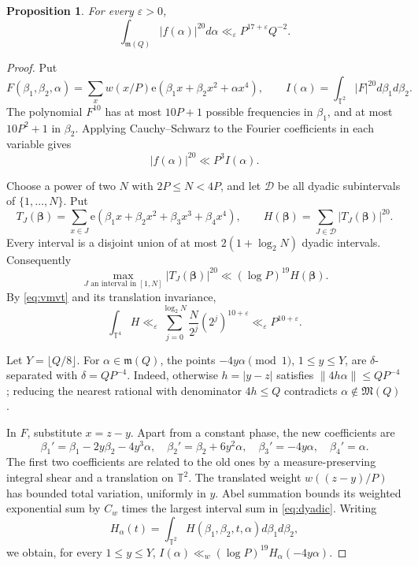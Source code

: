 \documentclass[11pt]{article}
\newtheorem{proposition}{Proposition}
\theoremstyle{remark}\newtheorem*{remark}{Remark}
\newcommand{\e}{\mathrm e}
\newcommand{\T}{\mathbb T}
\newcommand{\eps}{\varepsilon}
\newcommand{\M}{\mathfrak M}
\newcommand{\m}{\mathfrak m}
\begin{document}
\begin{proposition}\label{prop:transfer}
For every \(\eps>0\),
\[
 \int_{\m(Q)}|f(\alpha)|^{20}d\alpha
 \ll_\eps P^{17+\eps}Q^{-2}.
\]
\end{proposition}
\begin{proof}
Put
\[
 F(\beta_1,\beta_2,\alpha)
 =\sum_xw(x/P)\e(\beta_1x+\beta_2x^2+\alpha x^4),
 \qquad I(\alpha)=\int_{\T^2}|F|^{20}d\beta_1d\beta_2.
\]
The polynomial \(F^{10}\) has at most \(10P+1\) possible frequencies in
\(\beta_1\), and at most \(10P^2+1\) in \(\beta_2\). Applying
Cauchy--Schwarz to the Fourier coefficients in each variable gives
\begin{equation}\label{eq:evaluate}
 |f(\alpha)|^{20}\ll P^3 I(\alpha).
\end{equation}

Choose a power of two \(N\) with \(2P\le N<4P\), and let \(\mathcal D\)
be all dyadic subintervals of \(\{1,\ldots,N\}\). Put
\[
 T_J(\boldsymbol\beta)=\sum_{x\in J}
 \e(\beta_1x+\beta_2x^2+\beta_3x^3+\beta_4x^4),\qquad
 H(\boldsymbol\beta)=\sum_{J\in\mathcal D}|T_J(\boldsymbol\beta)|^{20}.
\]
Every interval is a disjoint union of at most \(2(1+\log_2N)\) dyadic
intervals. Consequently
\begin{equation}\label{eq:dyadic}
 \max_{J\text{ an interval in }[1,N]}|T_J(\boldsymbol\beta)|^{20}
 \ll(\log P)^{19}H(\boldsymbol\beta).
\end{equation}
By \eqref{eq:vmvt} and its translation invariance,
\begin{equation}\label{eq:hmean}
 \int_{\T^4}H\ll_\eps
 \sum_{j=0}^{\log_2N}\frac{N}{2^j}(2^j)^{10+\eps}
 \ll_\eps P^{10+\eps}.
\end{equation}

Let \(Y=\lfloor Q/8\rfloor\). For \(\alpha\in\m(Q)\), the points
\(-4y\alpha\pmod1\), \(1\le y\le Y\), are \(\delta\)-separated with
\(\delta=QP^{-4}\). Indeed, otherwise \(h=|y-z|\) satisfies
\(\|4h\alpha\|\le QP^{-4}\); reducing the nearest rational with
denominator \(4h\le Q\) contradicts \(\alpha\notin\M(Q)\).

In \(F\), substitute \(x=z-y\). Apart from a constant phase, the new
coefficients are
\[
 \beta_1'=\beta_1-2y\beta_2-4y^3\alpha,
 \quad\beta_2'=\beta_2+6y^2\alpha,
 \quad\beta_3'=-4y\alpha,
 \quad\beta_4'=\alpha.
\]
The first two coefficients are related to the old ones by a
measure-preserving integral shear and a translation on \(\T^2\).
The translated weight \(w((z-y)/P)\) has bounded total variation,
uniformly in \(y\). Abel summation bounds its weighted exponential sum
by \(C_w\) times the largest interval sum in \eqref{eq:dyadic}.
Writing
\[
 H_\alpha(t)=\int_{\T^2}H(\beta_1,\beta_2,t,\alpha)d\beta_1d\beta_2,
\]
we obtain, for every \(1\le y\le Y\),
\(I(\alpha)\ll_w(\log P)^{19}H_\alpha(-4y\alpha)\).


\end{proof}
\end{document}
